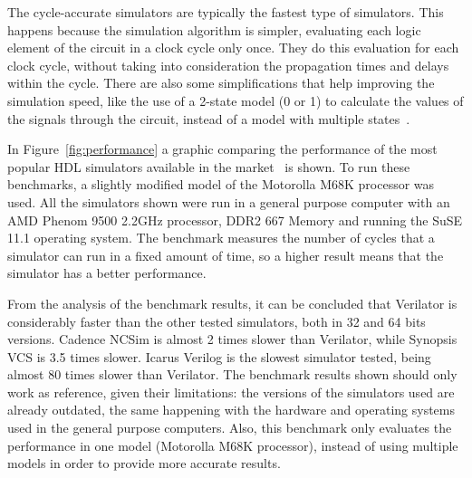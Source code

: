 The cycle-accurate simulators are typically the fastest type of simulators. This
happens because the simulation algorithm is simpler, evaluating each logic
element of the circuit in a clock cycle only once. They do this evaluation for
each clock cycle, without taking into consideration the propagation times and
delays within the cycle. There are also some simplifications that help improving
the simulation speed, like the use of a 2-state model (0 or 1) to calculate the
values of the signals through the circuit, instead of a model with multiple
states~\cite{bennett:verilator}.

In Figure~\ref{fig:performance} a graphic comparing the performance of the most
popular HDL simulators available in the market~\cite{verilator:benchmarks} is
shown. To run these benchmarks, a slightly modified model of the Motorolla M68K
processor was used. All the simulators shown were run in a general purpose
computer with an AMD Phenom 9500 2.2GHz processor, DDR2 667 Memory and running
the SuSE 11.1 operating system. The benchmark measures the number of cycles that
a simulator can run in a fixed amount of time, so a higher result means that
the simulator has a better performance.

From the analysis of the benchmark results, it can be concluded that Verilator
is considerably faster than the other tested simulators, both in 32 and 64 bits
versions. Cadence NCSim is almost 2 times slower than Verilator, while Synopsis
VCS is 3.5 times slower. Icarus Verilog is the slowest simulator tested, being
almost 80 times slower than Verilator. The benchmark results shown should only
work as reference, given their limitations: the versions of the simulators used
are already outdated, the same happening with the hardware and operating systems
used in the general purpose computers. Also, this benchmark only evaluates the
performance in one model (Motorolla M68K processor), instead of using multiple
models in order to provide more accurate results.

